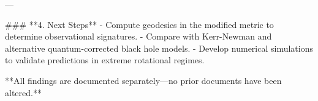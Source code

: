 ---

### **4. Next Steps**
- Compute geodesics in the modified metric to determine observational signatures.
- Compare with Kerr-Newman and alternative quantum-corrected black hole models.
- Develop numerical simulations to validate predictions in extreme rotational regimes.

**All findings are documented separately—no prior documents have been altered.**

